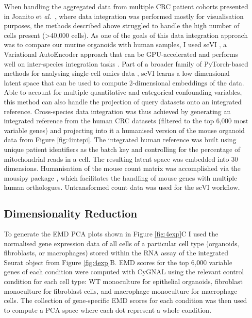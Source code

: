 When handling the aggregated data from multiple CRC patient cohorts presented in Joanito et \emph{al.}~\cite{joanito_single-cell_2022}, where data integration was performed mostly for visualisation purposes, the methods described above struggled to handle the high number of cells present (>40,000 cells). As one of the goals of this data integration approach was to compare our murine organoids with human samples, I used scVI \cite{lopez_deep_2018}, a Variational AutoEncoder approach that can be GPU-accelerated and performs well on inter-species integration tasks \cite{song_benchmarking_2023}. Part of a broader family of PyTorch-based methods for analysing single-cell omics data \cite{gayoso_python_2022}, scVI learns a low dimensional latent space that can be used to compute 2-dimensional embeddings of the data. Able to account for multiple quantitative and categorical confounding variables, this method can also handle the projection of query datasets onto an integrated reference.
Cross-species data integration was thus achieved by generating an integrated reference from the human CRC datasets (filtered to the top 6,000 most variable genes) and projecting into it a humanised version of the mouse organoid data from Figure \ref{fig:4intepi}. The integrated human reference was built using unique patient identifiers as the batch key and controlling for the percentage of mitochondrial reads in a cell. The resulting latent space was embedded into 30 dimensions. Humanisation of the mouse count matrix was accomplished via the mousipy package \cite{peidli_mousipy_2023}, which facilitates the handling of mouse genes with multiple human orthologues. Untransformed count data was used for the scVI workflow. 

\subsection{Dimensionality Reduction}

To generate the EMD PCA plots shown in Figure \ref{fig:4exp}C I used the normalised gene expression data of all cells of a particular cell type (organoids, fibroblasts, or macrophages) stored within the RNA assay of the integrated Seurat object from Figure \ref{fig:4exp}B. EMD scores for the top 6,000 variable genes of each condition were computed with CyGNAL \cite{ferran_cardoso_tape-labcygnal_2021} using the relevant control condition for each cell type: WT monoculture for epithelial organoids, fibroblast monoculture for fibroblast cells, and macrophage monoculture for macrophage cells. The collection of gene-specific EMD scores for each condition was then used to compute a PCA space where each dot represent a whole condition.

